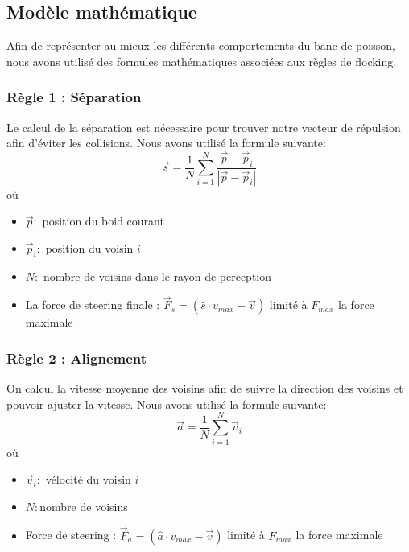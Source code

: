 \documentclass[11pt,a4paper]{article}
\begin{document}
\subsection{Modèle mathématique}
Afin de représenter au mieux les différents comportements du banc de poisson, nous avons utilisé des formules mathématiques associées aux règles de flocking.
\subsubsection{Règle 1 : Séparation}
Le calcul de la séparation est nécessaire pour trouver notre vecteur de répulsion afin d'éviter les collisions. Nous avons utilisé la formule suivante:
\begin{equation}
    \vec{s} = \frac{1}{N}\sum_{i = 1}^{N} \frac{\vec{p} - \vec{p}_{i}}{|\vec{p} - \vec{p}_{i}|}
\end{equation}
où
\begin{itemize}
    \item $\vec{p} : $ position du boid courant
    \item $\vec{p}_{i} : $ position du voisin $i$
    \item $N : $ nombre de voisins dans le rayon de perception
    \item La force de steering finale : $\vec{F}_{s} = (\hat{s} \cdot v_{max} - \vec{v})$ limité à $F_{max}$ la force maximale
\end{itemize}

\subsubsection{Règle 2 : Alignement}
On calcul la vitesse moyenne des voisins afin de suivre la direction des voisins et pouvoir ajuster la vitesse. Nous avons utilisé la formule suivante:
\begin{equation}
    \vec{a} = \frac{1}{N}\sum_{i = 1}^{N}\vec{v}_{i}
\end{equation}
où
\begin{itemize}
    \item $\vec{v}_{i} : $ vélocité du voisin $i$
    \item $N : $nombre de voisins 
    \item Force de steering : $\vec{F}_{a} = (\hat{a} \cdot v_{max} - \vec{v})$ limité à $F_{max}$ la force maximale
\end{itemize}
\end{document}
